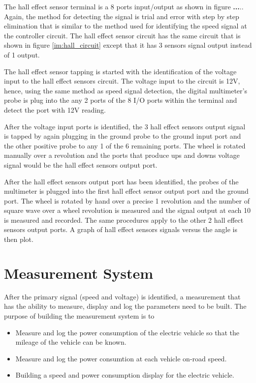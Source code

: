 The hall effect sensor terminal is a 8 ports input/output as shown in figure \textbf{...}.. Again, the method for detecting the signal is trial and error with step by step elimination that is similar to the method used for identifying the speed signal at the controller circuit. The hall effect sensor circuit has the same circuit that is shown in figure \ref{im:hall_circuit} except that it has 3 sensors signal output instead of 1 output. 

The hall effect sensor tapping is started with the identification of the voltage input to the hall effect sensors circuit. The voltage input to the circuit is 12V, hence, using the same method as speed signal detection, the digital multimeter's probe is plug into the any 2 ports of the 8 I/O ports within the terminal and detect the port with 12V reading.

After the voltage input ports is identified, the 3 hall effect sensors output signal is tapped by again plugging in the ground probe to the ground input port and the other positive probe to any 1 of the 6 remaining ports. The wheel is rotated manually over a revolution and the ports that produce ups and downs voltage signal would be the hall effect sensors output port.

After the hall effect sensors output port has been identified, the probes of the multimeter is plugged into the first hall effect sensor output port and the ground port. The wheel is rotated by hand over a precise 1 revolution and the number of square wave over a wheel revolution is measured and the signal output at each 10 \textdegree is measured and recorded. The same procedures apply to the other 2 hall effect sensors output ports. A graph of hall effect sensors signals versus the angle is then plot.

\section{Measurement System}
After the primary signal (speed and voltage) is identified, a measurement that has the ability to measure, display and log the parameters need to be built. The purpose of building the measurement system is to

\begin{itemize}
	\item{Measure and log the power consumption of the electric vehicle so that the mileage of the vehicle can be known.}
	\item{Measure and log the power consumtion at each vehicle on-road speed.}
	\item{Building a speed and power consumption display for the electric vehicle.}
\end{itemize}

